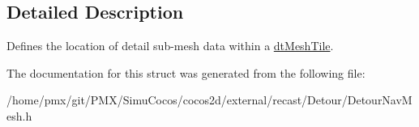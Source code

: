 \subsection{Detailed Description}
Defines the location of detail sub-\/mesh data within a \hyperlink{structdtMeshTile}{dt\+Mesh\+Tile}. 

The documentation for this struct was generated from the following file\+:\begin{DoxyCompactItemize}
\item 
/home/pmx/git/\+P\+M\+X/\+Simu\+Cocos/cocos2d/external/recast/\+Detour/Detour\+Nav\+Mesh.\+h\end{DoxyCompactItemize}
